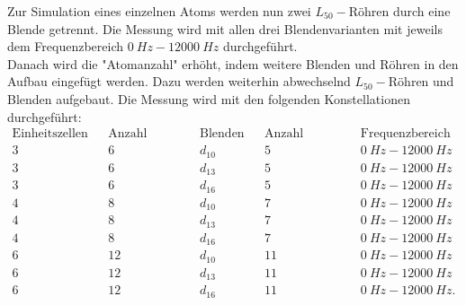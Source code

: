 Zur Simulation eines einzelnen Atoms werden nun zwei $L_{50}-$Röhren durch eine Blende getrennt.
Die Messung wird mit allen drei Blendenvarianten mit jeweils dem Frequenzbereich $\SI{0}{Hz}-\SI{12000}{Hz}$ durchgeführt.\\
%
Danach wird die "Atomanzahl" erhöht, indem weitere Blenden und Röhren in den Aufbau eingefügt werden.
Dazu werden weiterhin abwechselnd $L_{50}-$Röhren und Blenden aufgebaut.
Die Messung wird mit den folgenden Konstellationen durchgeführt:\\
\begin{align*}
\text{Einheitszellen} && \text{Anzahl Röhren}  && \text{Blenden}   && \text{Anzahl Blenden}  && \text{Frequenzbereich}\\
  3                   &&  6             && d_{10}           &&  5             && \SI{0}{Hz}-\SI{12000}{Hz} \\
  3                   &&  6             && d_{13}           &&  5             && \SI{0}{Hz}-\SI{12000}{Hz} \\
  3                   &&  6             && d_{16}           &&  5             && \SI{0}{Hz}-\SI{12000}{Hz} \\
  4                   &&  8             && d_{10}           &&  7             && \SI{0}{Hz}-\SI{12000}{Hz} \\
  4                   &&  8             && d_{13}           &&  7             && \SI{0}{Hz}-\SI{12000}{Hz} \\
  4                   &&  8             && d_{16}           &&  7             && \SI{0}{Hz}-\SI{12000}{Hz} \\
  6                   && 12             && d_{10}           && 11             && \SI{0}{Hz}-\SI{12000}{Hz} \\
  6                   && 12             && d_{13}           && 11             && \SI{0}{Hz}-\SI{12000}{Hz} \\
  6                   && 12             && d_{16}           && 11             && \SI{0}{Hz}-\SI{12000}{Hz}.\\
\end{align*}
%
